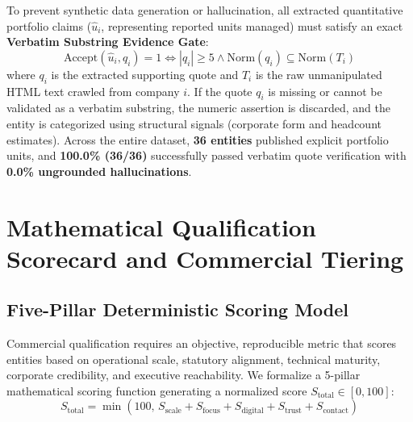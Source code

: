 \documentclass[11pt,a4paper]{article}
\begin{document}
To prevent synthetic data generation or hallucination, all extracted quantitative portfolio claims ($\hat{u}_i$, representing reported units managed) must satisfy an exact \textbf{Verbatim Substring Evidence Gate}:
\begin{equation}
\text{Accept}(\hat{u}_i, q_i) = 1 \iff |q_i| \ge 5 \land \text{Norm}(q_i) \subseteq \text{Norm}(T_i)
\end{equation}
where $q_i$ is the extracted supporting quote and $T_i$ is the raw unmanipulated HTML text crawled from company $i$. If the quote $q_i$ is missing or cannot be validated as a verbatim substring, the numeric assertion is discarded, and the entity is categorized using structural signals (corporate form and headcount estimates). Across the entire dataset, \textbf{36 entities} published explicit portfolio units, and \textbf{100.0\% (36/36)} successfully passed verbatim quote verification with \textbf{0.0\% ungrounded hallucinations}.

\section{Mathematical Qualification Scorecard and Commercial Tiering}

\subsection{Five-Pillar Deterministic Scoring Model}
Commercial qualification requires an objective, reproducible metric that scores entities based on operational scale, statutory alignment, technical maturity, corporate credibility, and executive reachability. We formalize a 5-pillar mathematical scoring function generating a normalized score $S_{\text{total}} \in [0, 100]$:
\begin{equation}
S_{\text{total}} = \min\left(100, \, S_{\text{scale}} + S_{\text{focus}} + S_{\text{digital}} + S_{\text{trust}} + S_{\text{contact}}\right)
\end{equation}
\end{document}
